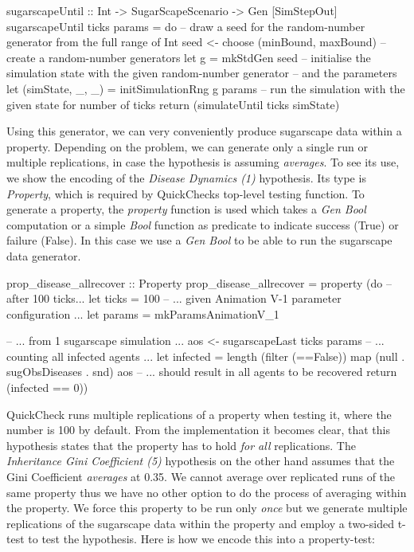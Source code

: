 \begin{HaskellCode}
sugarscapeUntil :: Int -> SugarScapeScenario -> Gen [SimStepOut]
sugarscapeUntil ticks params = do
  -- draw a seed for the random-number generator from the full range of Int
  seed <- choose (minBound, maxBound)
  -- create a random-number generators
  let g = mkStdGen seed
  -- initialise the simulation state with the given random-number generator
  -- and the parameters
  let (simState, _, _) = initSimulationRng g params
  -- run the simulation with the given state for number of ticks
  return (simulateUntil ticks simState)
\end{HaskellCode}

Using this generator, we can very conveniently produce sugarscape data within a property. Depending on the problem, we can generate only a single run or multiple replications, in case the hypothesis is assuming \textit{averages}. To see its use, we show the encoding of the \textit{Disease Dynamics (1)} hypothesis. Its type is \textit{Property}, which is required by QuickChecks top-level testing function. To generate a property, the \textit{property} function is used which takes a \textit{Gen Bool} computation or a simple \textit{Bool} function as predicate to indicate success (True) or failure (False). In this case we use a \textit{Gen Bool} to be able to run the sugarscape data generator.

\begin{HaskellCode}
prop_disease_allrecover :: Property
prop_disease_allrecover = property (do
  -- after 100 ticks...
  let ticks  = 100
  -- ... given Animation V-1 parameter configuration ...
  let params = mkParamsAnimationV_1

  -- ... from 1 sugarscape simulation ...
  aos <- sugarscapeLast ticks params
  -- ... counting all infected agents ...
  let infected = length (filter (==False)) map (null . sugObsDiseases . snd) aos
  -- ... should result in all agents to be recovered
  return (infected == 0))
\end{HaskellCode}

QuickCheck runs multiple replications of a property when testing it, where the number is 100 by default. From the implementation it becomes clear, that this hypothesis states that the property has to hold \textit{for all} replications. The \textit{Inheritance Gini Coefficient (5)} hypothesis on the other hand assumes that the Gini Coefficient \textit{averages} at 0.35. We cannot average over replicated runs of the same property thus we have no other option to do the process of averaging within the property. We force this property to be run only \textit{once} but we generate multiple replications of the sugarscape data within the property and employ a two-sided t-test to test the hypothesis. Here is how we encode this into a property-test:

